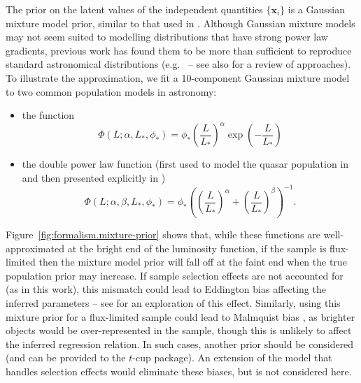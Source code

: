 \documentclass[fleqn,usenatbib]{rasti}
\newcommand{\indepvars}{\boldsymbol{x}_i}
\begin{document}
The prior on the latent values of the independent quantities $\{\indepvars\}$ is
a Gaussian mixture model prior, similar to that used in \citet{Kelly:2007}.
Although Gaussian mixture models may not seem suited to modelling distributions
that have strong power law gradients, previous work has found them to be more
than sufficient to reproduce standard astronomical distributions (e.g.\
\citealt{Blanton:2003, Kelly:2008} -- see also \citealt{Johnston:2011} for a
review of approaches). To illustrate the approximation, we fit a 10-component
Gaussian mixture model to two common population models in astronomy:
\begin{itemize}
    \item the \citet{Schechter:1976} function
    \begin{equation}
        \Phi(L; \alpha, L_*, \phi_*)
          = \phi_* \left(\frac{L}{L_*}\right)^\alpha
            \exp \left(-\frac{L}{L_*}\right)
    \end{equation}
    \item the double power law function (first used to model the quasar
    population in \citealt{Boyle:1987} and then presented explicitly in
    \citealt{Boyle:1988})
    \begin{equation}
        \Phi(L; \alpha, \beta, L_*, \phi_*)
          = \phi_* \left(\left(\frac{L}{L_*}\right)^\alpha
             + \left(\frac{L}{L_*}\right)^\beta\right)^{-1}.
    \end{equation}
\end{itemize}
Figure~\ref{fig:formalism.mixture-prior} shows that, while these functions are
well-approximated at the bright end of the luminosity function, if the sample is
flux-limited then the mixture model prior will fall off at the faint end when
the true population prior may increase. If sample selection effects are not
accounted for (as in this work), this mismatch could lead to Eddington bias
\citep{Eddington:1913} affecting the inferred parameters -- see
\citep{Andreon:2010} for an exploration of this effect. Similarly, using this
mixture prior for a flux-limited sample could lead to Malmquist bias
\citep{Malmquist:1922}, as brighter objects would be over-represented in the
sample, though this is unlikely to affect the inferred regression relation. In
such cases, another prior should be considered (and can be provided to the
$t$-cup package). An extension of the model that handles selection effects
\citep[e.g.][]{Kelly:2007} would eliminate these biases, but is not considered
here.
\end{document}
